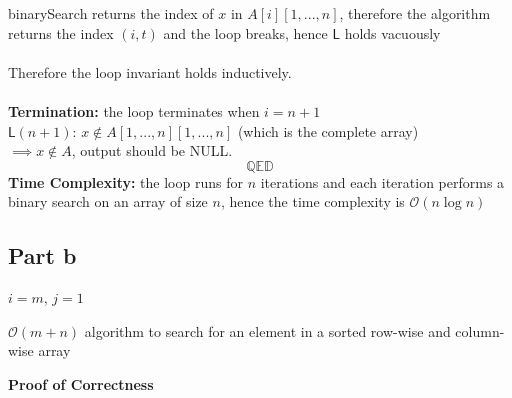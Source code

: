 \documentclass{article}
\begin{document}
binarySearch returns the index of $x$ in $A[i][1,...,n]$, therefore the algorithm returns the index $(i, t)$ and the loop breaks, hence $\mathsf{L}$ holds vacuously\\
\\
Therefore the loop invariant holds inductively.\\
\\
\textbf{Termination:} the loop terminates when $i = n+1$\\
$\mathsf{L}(n+1)$: $x \notin A[1,...,n][1,...,n]$ (which is the complete array)\\
$\implies x \notin A$, output should be NULL.
$$\mathbb{Q} \mathbb{E} \mathbb{D} $$
\textbf{Time Complexity:} the loop runs for $n$ iterations and each iteration performs a binary search on an array of size $n$, hence the time complexity is $\mathcal{O}(n \log n)$\\
\newpage
\subsection*{Part b}
\begin{algorithm}
    $i = m$, $j = 1$\;
    \caption{$\mathcal{O}(m + n)$ algorithm to search for an element in a sorted row-wise and column-wise array}
\end{algorithm}
\textbf{Proof of Correctness}\\
\end{document}
